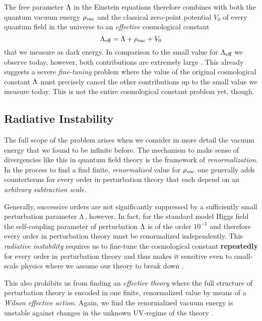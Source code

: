 \documentclass[12pt,parskip=half]{scrreprt}
\begin{document}
The free parameter \(\Lambda\) in the Einstein equations therefore combines with both the quantum vacuum energy \(\rho_\textnormal{vac}\) and the classical zero-point potential \(V_0\) of every quantum field in the universe to an \emph{effective} cosmological constant
\begin{equation}
	\Lambda_\textnormal{eff} = \Lambda + \rho_\textnormal{vac} + V_0
\end{equation}
that we measure as dark energy. In comparison to the small value for \(\Lambda_\textnormal{eff}\) we observe today, however, both contributions are extremely large \citep{Martin2012}.  This already suggests a severe \emph{fine-tuning} problem where the value of the original cosmological constant \(\Lambda\) must precisely cancel the other contributions up to the small value we measure today.  This is not the entire cosmological constant problem yet, though.

\subsection{Radiative Instability}\label{sec:rad_instability}

The full scope of the problem arises when we consider in more detail the vacuum energy that we found to be infinite before. The mechanism to make sense of divergencies like this in quantum field theory is the framework of \emph{renormalization}. In the process to find a find finite, \emph{renormalized} value for \(\rho_\textnormal{vac}\) one generally adds counterterms for every order in perturbation theory that each depend on an \emph{arbitrary subtraction scale}.

Generally, successive orders are not significantly suppressed by a sufficiently small perturbation parameter \(\Lambda\), however. In fact, for the standard model Higgs field the self-coupling parameter of perturbation \(\Lambda\) is of the order \(10^{-1}\)  and therefore every order in perturbation theory must be renormalized independently. This \emph{radiative instability} requires us to fine-tune the cosmological constant \textbf{repeatedly} for every order in perturbation theory and thus makes it sensitive even to small-scale physics where we assume our theory to break down \citep{Datta1996}.

This also prohibits us from finding an \emph{effective theory} where the full structure of perturbation theory is encoded in one finite, renormalized value by means of a \emph{Wilson effective action}.  Again, we find the renormalized vacuum energy is unstable against changes in the unknown UV-regime of the theory \citep{Datta1996}.
\end{document}
